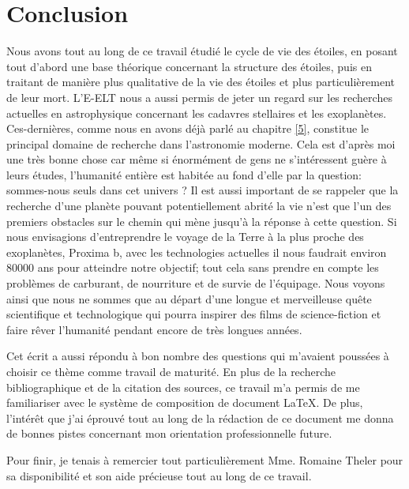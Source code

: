 

\chapter*{Conclusion}


\vfill

Nous avons tout au long de ce travail étudié le cycle de vie des étoiles, en posant tout d'abord une base théorique concernant la structure des étoiles, puis en traitant de manière plus qualitative de la vie des étoiles et plus particulièrement de leur mort. L'E-ELT nous a aussi permis de jeter un regard sur les recherches actuelles en astrophysique concernant les cadavres stellaires et les exoplanètes. Ces-dernières, comme nous en avons déjà parlé au chapitre \ref{5}, constitue le principal domaine de recherche dans l'astronomie moderne. Cela est d'après moi une très bonne chose car même si énormément de gens ne s'intéressent guère à leurs études, l'humanité entière est habitée au fond d'elle par la question: sommes-nous seuls dans cet univers ? Il est aussi important de se rappeler que la recherche d'une planète pouvant potentiellement abrité la vie n'est que l'un des premiers obstacles sur le chemin qui mène jusqu'à la réponse à cette question. Si nous envisagions d'entreprendre le voyage de la Terre à la plus proche des exoplanètes, Proxima b, avec les technologies actuelles il nous faudrait environ 80000 ans pour atteindre notre objectif; tout cela sans prendre en compte les problèmes de carburant, de nourriture et de survie de l'équipage. Nous voyons ainsi que nous ne sommes que au départ d'une longue et merveilleuse quête scientifique et technologique qui pourra inspirer des films de science-fiction et faire rêver l'humanité pendant encore de très longues années.\smallskip

Cet écrit a aussi répondu à bon nombre des questions qui m'avaient poussées à choisir ce thème comme travail de maturité. En plus de la recherche bibliographique et de la citation des sources, ce travail m'a permis de me familiariser avec le système de composition de document \LaTeX. De plus, l'intérêt que j'ai éprouvé tout au long de la rédaction de ce document me donna de bonnes pistes concernant mon orientation professionnelle future.\bigskip

Pour finir, je tenais à remercier tout particulièrement Mme. Romaine Theler pour sa disponibilité et son aide précieuse tout au long de ce travail.





\vfill